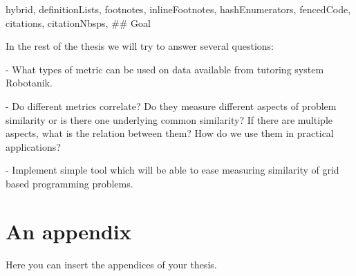 \documentclass[
  digital, %
  table,   %
  nolof,     %
  nolot,     %
  nocover
]{fithesis3}
\begin{document}
\begin{markdown*}{%
  hybrid,
  definitionLists,
  footnotes,
  inlineFootnotes,
  hashEnumerators,
  fencedCode,
  citations,
  citationNbsps,
}
## Goal

In the rest of the thesis we will try to answer several questions:

- What types of metric can be used on data available from tutoring system Robotanik.

- Do different metrics correlate? Do they measure different aspects of problem similarity or is there one underlying common similarity? If there are multiple aspects, what is the relation between them? How do we use them in practical applications?

- Implement simple tool which will be able to ease measuring similarity of grid based programming problems.

%
%

\iffalse %

# Robotanik

In this chapter we will talk more about things that are specific to Robotanik and data used in our analysis.

Most of the experiments were executed on data collected from programming environment Robotanik available at [tutor.fi.muni.cz](http://tutor.fi.muni.cz/). Robotanik is programming environment with 78 handcrafted problems for student to solve. Goal of the student is to write program for robot to traverse board and collect all flowers. Each problem has board filled with tiles of stones, colored tiles (green, red, brown) and flowers.

## Data

**Problem statements**

**Solutions**

**Performance data**

## Chosen metrics

In this thesis we are consider only some metrics. We will describe them in detail in this chapter.

### Problem statement

### Solutions

### Performance data


%
%

# Tool

## Tool capabilities

## Chosen metrics

## Evaluation

### Compare metrics

### Collecting crowd-truth

## Visualisations

\fi %

\end{markdown*}

  \makeatletter\thesis@blocks@clear\makeatother
  \printindex

\appendix %
\chapter{An appendix}
Here you can insert the appendices of your thesis.
\end{document}
